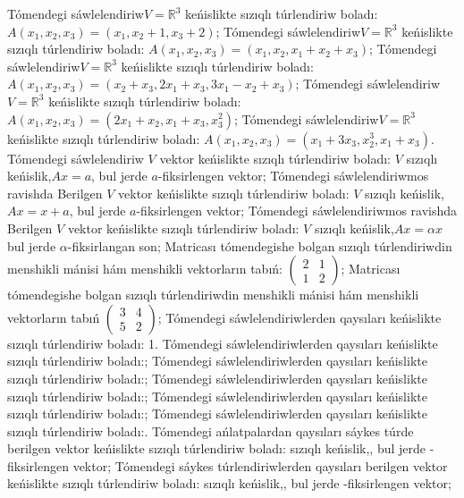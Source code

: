 Tómendegi sáwlelendiriw\(V = \mathbb{R}^{3}\) keńislikte sızıqlı túrlendiriw boladı: \(A\left( x_{1},x_{2},x_{3} \right) = \left( x_{1},x_{2} + 1,x_{3} + 2 \right)\);
Tómendegi sáwlelendiriw\(V = \mathbb{R}^{3}\) keńislikte sızıqlı túrlendiriw boladı: \(A\left( x_{1},x_{2},x_{3} \right) = \left( x_{1},x_{2},x_{1} + x_{2} + x_{3} \right)\);
Tómendegi sáwlelendiriw\(V = \mathbb{R}^{3}\) keńislikte sızıqlı túrlendiriw boladı: \(A\left( x_{1},x_{2},x_{3} \right) = \left( x_{2} + x_{3},2x_{1} + x_{3},3x_{1} - x_{2} + x_{3} \right)\);
Tómendegi sáwlelendiriw\(V = \mathbb{R}^{3}\) keńislikte sızıqlı túrlendiriw boladı: \(A\left( x_{1},x_{2},x_{3} \right) = \left( 2x_{1} + x_{2},x_{1} + x_{3},x_{3}^{2} \right)\);
Tómendegi sáwlelendiriw\(V = \mathbb{R}^{3}\) keńislikte sızıqlı túrlendiriw boladı: \(A\left( x_{1},x_{2},x_{3} \right) = \left( x_{1} + 3x_{3},x_{2}^{3},x_{1} + x_{3} \right)\).
Tómendegi sáwlelendiriw \(V\) vektor keńislikte sızıqlı túrlendiriw boladı: \(V\) sızıqlı keńislik,\(Ax = a\), bul jerde \(a\)-fiksirlengen vektor;
Tómendegi sáwlelendiriwmos ravishda Berilgen \(V\) vektor keńislikte sızıqlı túrlendiriw boladı: \(V\) sızıqlı keńislik,\(Ax = x + a\), bul jerde \(a\)-fiksirlengen vektor;
Tómendegi sáwlelendiriwmos ravishda Berilgen \(V\) vektor keńislikte sızıqlı túrlendiriw boladı: \(V\) sızıqlı keńislik,\(Ax = \alpha x\) bul jerde \(\alpha\)-fiksirlangan son;
Matricası tómendegishe bolgan sızıqlı túrlendiriwdin menshikli mánisi hám menshikli vektorların tabıń: \(\begin{pmatrix} 2 & 1 \\ 1 & 2 \end{pmatrix}\);
Matricası tómendegishe bolgan sızıqlı túrlendiriwdin menshikli mánisi hám menshikli vektorların tabıń \(\begin{pmatrix} 3 & 4 \\ 5 & 2 \end{pmatrix}\);
Tómendegi sáwlelendiriwlerden qaysıları keńislikte sızıqlı túrlendiriw boladı: 1.
Tómendegi sáwlelendiriwlerden qaysıları keńislikte sızıqlı túrlendiriw boladı:;
Tómendegi sáwlelendiriwlerden qaysıları keńislikte sızıqlı túrlendiriw boladı:;
Tómendegi sáwlelendiriwlerden qaysıları keńislikte sızıqlı túrlendiriw boladı:;
Tómendegi sáwlelendiriwlerden qaysıları keńislikte sızıqlı túrlendiriw boladı:;
Tómendegi sáwlelendiriwlerden qaysıları keńislikte sızıqlı túrlendiriw boladı:.
Tómendegi ańlatpalardan qaysıları sáykes túrde berilgen vektor keńislikte sızıqlı túrlendiriw boladı: sızıqlı keńislik,, bul jerde -fiksirlengen vektor;
Tómendegi sáykes túrlendiriwlerden qaysıları berilgen vektor keńislikte sızıqlı túrlendiriw boladı: sızıqlı keńislik,, bul jerde -fiksirlengen vektor;
